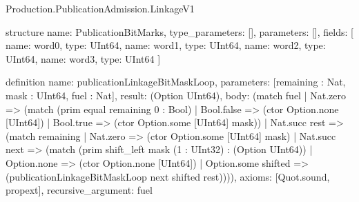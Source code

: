 \begin{lexlean}{Production.PublicationAdmission.LinkageV1}
\begin{semanticmodule}
structure{
  name: PublicationBitMarks,
  type_parameters: [],
  parameters: [],
  fields: [
    {name: word0, type: UInt64},
    {name: word1, type: UInt64},
    {name: word2, type: UInt64},
    {name: word3, type: UInt64}
  ]
}

definition{
  name: publicationLinkageBitMaskLoop,
  parameters: [remaining : Nat, mask : UInt64, fuel : Nat],
  result: (Option UInt64),
  body: (match fuel
    | Nat.zero => (match (prim equal remaining 0 : Bool)
      | Bool.false => (ctor Option.none [UInt64])
      | Bool.true => (ctor Option.some [UInt64] mask))
    | Nat.succ rest => (match remaining
      | Nat.zero => (ctor Option.some [UInt64] mask)
      | Nat.succ next => (match (prim shift_left mask (1 : UInt32) : (Option UInt64))
        | Option.none => (ctor Option.none [UInt64])
        | Option.some shifted => (publicationLinkageBitMaskLoop next shifted rest)))),
  axioms: [Quot.sound, propext],
  recursive_argument: fuel
}


\end{semanticmodule}
\end{lexlean}

